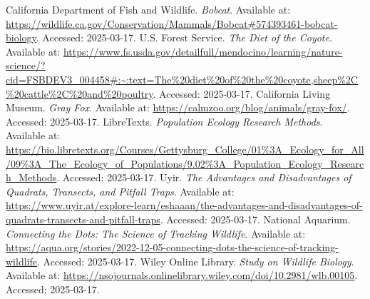 \documentclass[a4paper]{article}
\begin{document}
\begin{thebibliography}{99}

     California Department of Fish and Wildlife. \textit{Bobcat}. Available at: \url{https://wildlife.ca.gov/Conservation/Mammals/Bobcat#574393461-bobcat-biology}. Accessed: 2025-03-17.
     U.S. Forest Service. \textit{The Diet of the Coyote}. Available at: \url{https://www.fs.usda.gov/detailfull/mendocino/learning/nature-science/?cid=FSBDEV3_004458#:~:text=The%20diet%20of%20the%20coyote,sheep%2C%20cattle%2C%20and%20poultry}. Accessed: 2025-03-17.
     California Living Museum. \textit{Gray Fox}. Available at: \url{https://calmzoo.org/blog/animals/gray-fox/}. Accessed: 2025-03-17.
     LibreTexts. \textit{Population Ecology Research Methods}. Available at: \url{https://bio.libretexts.org/Courses/Gettysburg_College/01%3A_Ecology_for_All/09%3A_The_Ecology_of_Populations/9.02%3A_Population_Ecology_Research_Methods}. Accessed: 2025-03-17.
     Uyir. \textit{The Advantages and Disadvantages of Quadrats, Transects, and Pitfall Traps}. Available at: \url{https://www.uyir.at/explore-learn/eshaaan/the-advantages-and-disadvantages-of-quadrats-transects-and-pitfall-traps}. Accessed: 2025-03-17.
     National Aquarium. \textit{Connecting the Dots: The Science of Tracking Wildlife}. Available at: \url{https://aqua.org/stories/2022-12-05-connecting-dots-the-science-of-tracking-wildlife}. Accessed: 2025-03-17.
     Wiley Online Library. \textit{Study on Wildlife Biology}. Available at: \url{https://nsojournals.onlinelibrary.wiley.com/doi/10.2981/wlb.00105}. Accessed: 2025-03-17.

\end{thebibliography}
\end{document}

